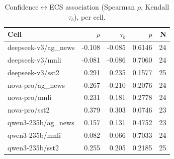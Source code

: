 \begin{table}[t]
\centering
\caption{Confidence$\leftrightarrow$ECS association (Spearman $\rho$, Kendall $\tau_b$), per cell.}
\label{tab:confidence}
\begin{tabular}{lrrrr}
\toprule
Cell & $\rho$ & $\tau_b$ & $p$ & N \\
\midrule
deepseek-v3/ag_news & -0.108 & -0.085 & 0.6146 & 24 \\
deepseek-v3/mnli & -0.081 & -0.086 & 0.7060 & 24 \\
deepseek-v3/sst2 & 0.291 & 0.235 & 0.1577 & 25 \\
nova-pro/ag_news & -0.267 & -0.210 & 0.2076 & 24 \\
nova-pro/mnli & 0.231 & 0.181 & 0.2778 & 24 \\
nova-pro/sst2 & 0.379 & 0.303 & 0.0746 & 23 \\
qwen3-235b/ag_news & 0.157 & 0.131 & 0.4752 & 23 \\
qwen3-235b/mnli & 0.082 & 0.066 & 0.7033 & 24 \\
qwen3-235b/sst2 & 0.255 & 0.205 & 0.2185 & 25 \\
\bottomrule
\end{tabular}
\end{table}
